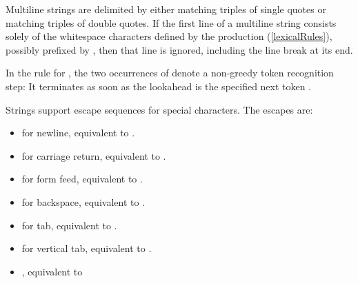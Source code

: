 \documentclass[makeidx]{article}
\begin{document}
{\LMHash{}%
Multiline strings are delimited by either
matching triples of single quotes or
matching triples of double quotes.
If the first line of a multiline string consists solely of
the whitespace characters defined by the production 
(\ref{lexicalRules}),
possibly prefixed by ,
then that line is ignored,
including the line break at its end.


\LMHash{}%
In the rule for ,
the two occurrences of 
denote a non-greedy token recognition step:
It terminates as soon as the lookahead is the specified next token
.


\LMHash{}%
Strings support escape sequences for special characters.
The escapes are:

\begin{itemize}
\item
   for newline, equivalent to .
\item
   for carriage return, equivalent to .
\item
   for form feed, equivalent to .
\item
   for backspace, equivalent to .
\item
   for tab, equivalent to .
\item
   for vertical tab, equivalent to .
\item
  , equivalent to


\end{itemize}}
\end{document}
